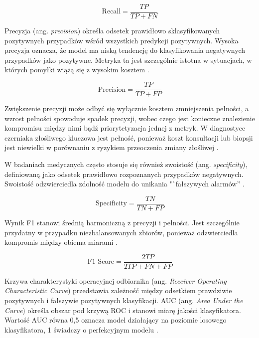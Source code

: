 \begin{equation}
	\text{Recall}=\frac{TP}{TP+FN}
\end{equation}

Precyzja (ang. \textit{precision}) określa odsetek prawidłowo sklasyfikowanych pozytywnych przypadków wśród wszystkich predykcji pozytywnych. 
Wysoka precyzja oznacza, że model ma niską tendencję do klasyfikowania negatywnych przypadków jako pozytywne.
Metryka ta jest szczególnie istotna w sytuacjach, w których pomyłki wiążą się z wysokim kosztem \cite{Rainio_2024, Erickson_Kitamura_2021, Nowak_2022}.

\begin{equation}
	\text{Precision}=\frac{TP}{TP+FP}
\end{equation}

Zwiększenie precyzji może odbyć się wyłącznie kosztem zmniejszenia pełności, a wzrost pełności spowoduje spadek precyzji, wobec czego jest konieczne znalezienie kompromisu między nimi bądź priorytetyzacja jednej z metryk.
W diagnostyce czerniaka złośliwego kluczowa jest pełność, ponieważ koszt konsultacji lub biopsji jest niewielki w porównaniu z ryzykiem przeoczenia zmiany złośliwej \cite{Rainio_2024, Grandini_Bagli_Visani_2020, Nowak_2022}.

W badaniach medycznych często stosuje się również swoistość (ang. \textit{specificity}), definiowaną jako odsetek prawidłowo rozpoznanych przypadków negatywnych.
Swoistość odzwierciedla zdolność modelu do unikania "`fałszywych alarmów'' \cite{Rainio_2024}. 

\begin{equation}
	\text{Specificity}=\frac{TN}{TN+FP}
\end{equation}

Wynik F1 stanowi średnią harmoniczną z precyzji i pełności.
Jest szczególnie przydatny w przypadku niezbalansowanych zbiorów, ponieważ odzwierciedla kompromis między obiema miarami \cite{Rainio_2024, Erickson_Kitamura_2021, Nowak_2022}.

\begin{equation}
	\text{F1 Score}=\frac{2TP}{2TP+FN+FP}
\end{equation}

Krzywa charakterystyki operacyjnej odbiornika (ang. \textit{Receiver Operating Characteristic Curve}) przedstawia zależność między odsetkiem prawdziwie pozytywnych i fałszywie pozytywnych klasyfikacji.
AUC (ang. \textit{Area Under the Curve}) określa obszar pod krzywą ROC i stanowi miarę jakości klasyfikatora. 
Wartość AUC równa 0,5 oznacza model działający na poziomie losowego klasyfikatora, 1 świadczy o perfekcyjnym modelu \cite{Erickson_Kitamura_2021}.

